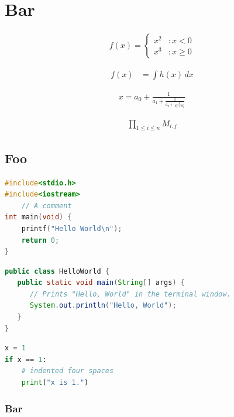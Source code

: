\documentclass[tcc]{../classe_uftex/uftex}
\begin{document}
\section{Bar}

\lipsum[9] \cite{CORBA:spec}

\begin{eqnarray}
f(x) = \left\{
  \begin{array}{lr}
    x^2 & : x < 0\\
    x^3 & : x \ge 0
  \end{array}
\right.
\end{eqnarray}

\begin{eqnarray}
f(x) & = \int h(x)\, dx
\end{eqnarray}

\begin{eqnarray}
x = a_0 + \frac{1}{a_1 + \frac{1}{a_2 + \frac{1}{a_3 + a_4}}}
\end{eqnarray}

\begin{eqnarray}
\prod_{1\le i \le n}
     M_{i,j}
\end{eqnarray}

\lipsum[10] \cite{gridftp}

\subsection{Foo}

\begin{lstlisting}[language=C]
#include<stdio.h>
#include<iostream>
    // A comment
int main(void) {
    printf("Hello World\n");
    return 0;
}
\end{lstlisting}

\begin{lstlisting}[language=Java]
public class HelloWorld {
   public static void main(String[] args) {
      // Prints "Hello, World" in the terminal window.
      System.out.println("Hello, World");
   }
}
\end{lstlisting}

\begin{lstlisting}[language=Python]
x = 1
if x == 1:
    # indented four spaces
    print("x is 1.")
\end{lstlisting}

\subsubsection{Bar}
\end{document}
